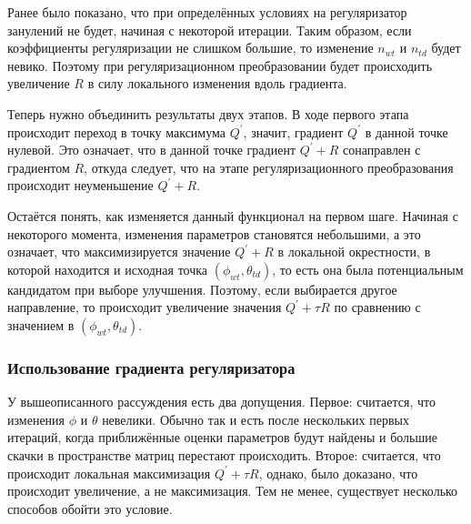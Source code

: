 \documentclass[12pt, twoside]{article}
\begin{document}
Ранее было показано, что при определённых условиях на регуляризатор занулений не будет, начиная с некоторой итерации. Таким образом, если коэффициенты регуляризации не слишком большие, то изменение $n_{wt}$ и $n_{td}$ будет невико. Поэтому при регуляризационном преобразовании будет происходить увеличение $R$ в силу локального изменения вдоль градиента.

Теперь нужно объединить результаты двух этапов. В ходе первого этапа происходит переход в точку максимума $Q^{\prime}$, значит, градиент $Q^{\prime}$ в данной точке нулевой. Это означает, что в данной точке градиент $Q^{\prime} +  R$ сонаправлен с градиентом $R$, откуда следует, что на этапе регуляризационного преобразования происходит неуменьшение $Q^{\prime} +  R$. 

Остаётся понять, как изменяется данный функционал на первом шаге. Начиная с некоторого момента, изменения параметров становятся небольшими, а это означает, что максимизируется значение $Q^{\prime} +  R$ в локальной окрестности, в которой находится и исходная точка $(\phi_{wt}, \theta_{td})$, то есть она была потенциальным кандидатом при выборе улучшения. Поэтому, если выбирается другое направление, то происходит увеличение значения $Q^{\prime} + \tau R$ по сравнению с значением в $(\phi_{wt}, \theta_{td})$.

\subsubsection{Использование градиента регуляризатора}
\label{subsec:gradientuse}
У вышеописанного рассуждения есть два допущения. Первое: считается, что изменения $\phi$ и $\theta$ невелики. Обычно так и есть после нескольких первых итераций, когда приближённые оценки параметров будут найдены и большие скачки в пространстве матриц перестают происходить. Второе: считается, что происходит локальная максимизация $Q^{\prime} + \tau R$, однако, было доказано, что происходит увеличение, а не максимизация. Тем не менее, существует несколько способов обойти это условие. 
\end{document}
